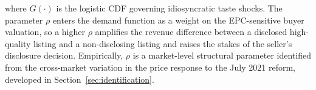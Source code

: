 where $G(\cdot)$ is the logistic CDF governing idiosyncratic taste shocks. The parameter $\rho$ enters the demand function as a weight on the EPC-sensitive buyer valuation, so a higher $\rho$ amplifies the revenue difference between a disclosed high-quality listing and a non-disclosing listing and raises the stakes of the seller's disclosure decision. Empirically, $\rho$ is a market-level structural parameter identified from the cross-market variation in the price response to the July 2021 reform, developed in Section~\ref{sec:identification}.
